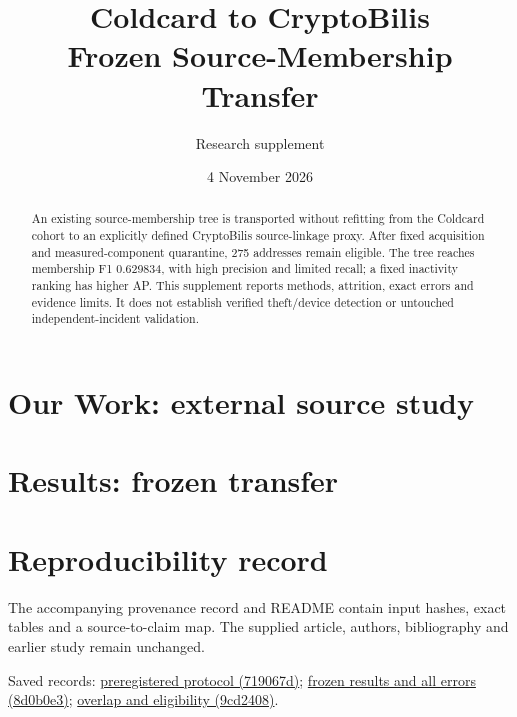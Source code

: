 \documentclass[11pt,a4paper]{article}
\title{Coldcard to CryptoBilis\\Frozen Source-Membership Transfer}
\author{Research supplement}
\date{4 November 2026}
\begin{document}
\maketitle
\begin{abstract}
An existing source-membership tree is transported without refitting from the Coldcard cohort to an explicitly defined CryptoBilis source-linkage proxy. After fixed acquisition and measured-component quarantine, 275 addresses remain eligible. The tree reaches membership F1 0.629834, with high precision and limited recall; a fixed inactivity ranking has higher AP. This supplement reports methods, attrition, exact errors and evidence limits. It does not establish verified theft/device detection or untouched independent-incident validation.
\end{abstract}
\section{Our Work: external source study}

\section{Results: frozen transfer}

\section{Reproducibility record}
The accompanying provenance record and README contain input hashes, exact tables and a source-to-claim map. The supplied article, authors, bibliography and earlier study remain unchanged.

Saved records: \href{https://github.com/HnsHugo/STAGE-UFU/commit/719067dd4467bd59d7da6004cacad022fb5aaf68}{preregistered protocol (719067d)};
\href{https://github.com/HnsHugo/STAGE-UFU/commit/8d0b0e345cbcb29d2e435cb9a9906a873721b825}{frozen results and all errors (8d0b0e3)};
\href{https://github.com/HnsHugo/STAGE-UFU/commit/9cd2408880a354c86513c73f7112f45578615594}{overlap and eligibility (9cd2408)}.
\end{document}
